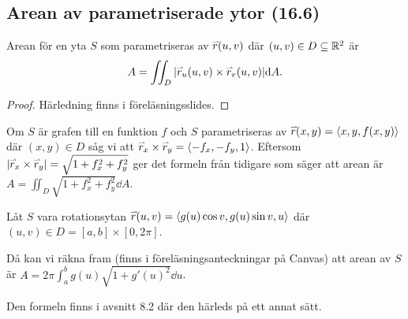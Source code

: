 \documentclass[a4paper]{article}
\begin{document}
\subsection{Arean av parametriserade ytor (16.6)}
\begin{sats}
    Arean för en yta \(
        S
    \) som parametriseras av \(
        \accentset{\rightharpoonup}{r}(u,v)
    \) där \(
        (u,v) \in D \subseteq \mathbb{R}^2
    \) är \[
        A = \iint_D \abs{ \accentset{\rightharpoonup}{r}_u(u,v) \times \accentset{\rightharpoonup}{r}_v(u,v) } \dd A.
    \] 

    \begin{proof}
        Härledning finns i föreläsningsslides.
    \end{proof}
\end{sats}

\begin{ex}
    Om \(
        S
    \) är grafen till en funktion \(
        f
    \) och \(
        S
    \) parametriseras av \(
        \accentset{\rightharpoonup}{r}(x,y) = \left\langle x, y, f(x,y) \right\rangle
    \) där \(
        (x,y) \in D
    \) såg vi att \(
        \accentset{\rightharpoonup}{r}_x \times \accentset{\rightharpoonup}{r}_y = \left\langle -f_x, -f_y, 1\right\rangle
    \). Eftersom \(
        \abs{\accentset{\rightharpoonup}{r}_x \times \accentset{\rightharpoonup}{r}_y} = \sqrt{ 1 + f_x^2 + f_y^2 }
    \) ger det formeln från tidigare som säger att arean är \(
        A = \iint_D \sqrt{1 + f_x^2 + f_y^2} \dd A
    \).
\end{ex}

\begin{ex}
    Låt \(
        S
    \) vara rotationsytan \(
        \accentset{\rightharpoonup}{r}(u,v) = \left\langle g(u) \cos v, g(u) \sin v, u\right\rangle
    \) där \(
        (u,v) \in D = [a,b] \times [0,2\pi]
    \). 

    Då kan vi räkna fram (finns i föreläsningsanteckningar på Canvas) att arean 
    av \(
        S
    \) är \(
        A = 2\pi \int_a^b g(u) \sqrt{1+g'(u)^2} \dd u
    \).

    Den formeln finns i avsnitt 8.2 där den härleds på ett annat sätt.
\end{ex}
\end{document}
